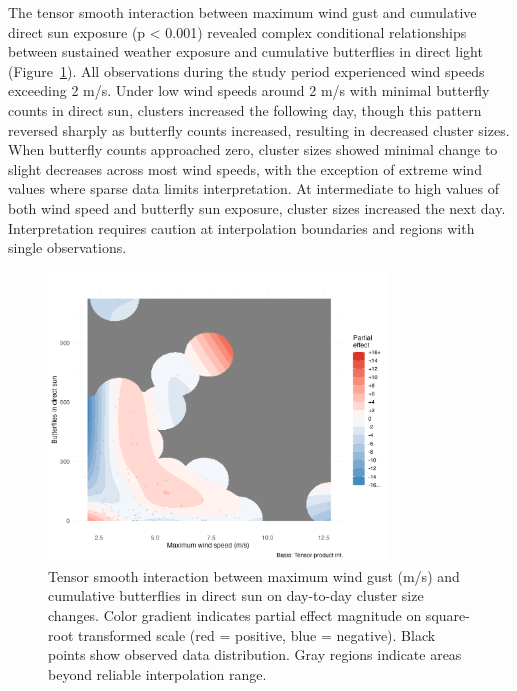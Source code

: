 The tensor smooth interaction between maximum wind gust and cumulative direct sun exposure (p < 0.001) revealed complex conditional relationships between sustained weather exposure and cumulative butterflies in direct light (Figure~\ref{fig:interaction_wind_sun_sunset}). All observations during the study period experienced wind speeds exceeding 2 m/s. Under low wind speeds around 2 m/s with minimal butterfly counts in direct sun, clusters increased the following day, though this pattern reversed sharply as butterfly counts increased, resulting in decreased cluster sizes. When butterfly counts approached zero, cluster sizes showed minimal change to slight decreases across most wind speeds, with the exception of extreme wind values where sparse data limits interpretation. At intermediate to high values of both wind speed and butterfly sun exposure, cluster sizes increased the next day. Interpretation requires caution at interpolation boundaries and regions with single observations. 

\begin{figure}[htbp]
    \centering
    \includegraphics[width=0.8\textwidth]{supplemental/results/sunset/figures/interaction_wind_x_sun_binned.png}
    \caption{Tensor smooth interaction between maximum wind gust (m/s) and cumulative butterflies in direct sun on day-to-day cluster size changes. Color gradient indicates partial effect magnitude on square-root transformed scale (red = positive, blue = negative). Black points show observed data distribution. Gray regions indicate areas beyond reliable interpolation range.}
    \label{fig:interaction_wind_sun_sunset}
\end{figure}

